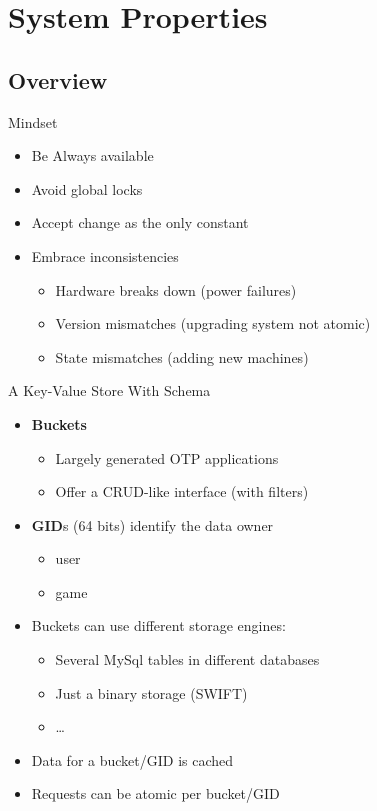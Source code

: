 \documentclass[aspectratio=169]{beamer}
\begin{document}
\section{System Properties}

\subsection{Overview}

\begin{frame}{Mindset}
    \begin{itemize}
        \item Be Always available
        \item Avoid global locks
        \item Accept change as the only constant
        \item Embrace inconsistencies
            \begin{itemize}
                \item Hardware breaks down (power failures)
                \item Version mismatches (upgrading system not atomic)
                \item State mismatches (adding new machines)
            \end{itemize}
    \end{itemize}
\end{frame}

\begin{frame}{A Key-Value Store With Schema}
    \begin{itemize}
        \item \textbf{Buckets}
            \begin{itemize}
                \item Largely generated OTP applications
                \item Offer a CRUD-like interface (with filters)
            \end{itemize}
        \item \textbf{GID}s (64 bits) identify the data owner
            \begin{itemize}
                \item user
                \item game
            \end{itemize}
        \item Buckets can use different storage engines:
            \begin{itemize}
                \item Several MySql tables in different databases
                \item Just a binary storage (SWIFT)
                \item \dots
            \end{itemize}
        \item Data for a bucket/GID is cached
        \item Requests can be atomic per bucket/GID
    \end{itemize}
\end{frame}
\end{document}
